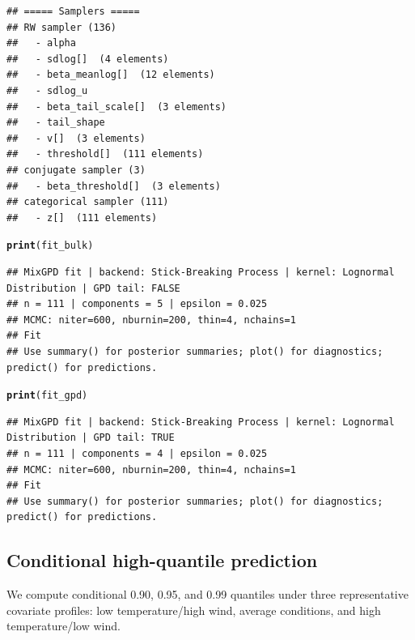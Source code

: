 \documentclass[article]{jss}\usepackage[]{graphicx}\usepackage[]{xcolor}
\makeatletter
\newcommand{\hldef}[1]{\textcolor[rgb]{0.345,0.345,0.345}{#1}}%
\newcommand{\hlkwd}[1]{\textcolor[rgb]{0.737,0.353,0.396}{\textbf{#1}}}%
\newenvironment{kframe}{%
 \def\at@end@of@kframe{}%
 \ifinner\ifhmode%
  \def\at@end@of@kframe{\end{minipage}}%
  \begin{minipage}{\columnwidth}%
 \fi\fi%
 \def\FrameCommand##1{\hskip\@totalleftmargin \hskip-\fboxsep
 \colorbox{shadecolor}{##1}\hskip-\fboxsep
     \hskip-\linewidth \hskip-\@totalleftmargin \hskip\columnwidth}%
 \MakeFramed {\advance\hsize-\width
   \@totalleftmargin\z@ \linewidth\hsize
   \@setminipage}}%
 {\par\unskip\endMakeFramed%
 \at@end@of@kframe}
\newenvironment{knitrout}{}{} %
\makeatother
\begin{document}
\begin{knitrout}
\begin{kframe}
\begin{verbatim}
## ===== Samplers =====
## RW sampler (136)
##   - alpha
##   - sdlog[]  (4 elements)
##   - beta_meanlog[]  (12 elements)
##   - sdlog_u
##   - beta_tail_scale[]  (3 elements)
##   - tail_shape
##   - v[]  (3 elements)
##   - threshold[]  (111 elements)
## conjugate sampler (3)
##   - beta_threshold[]  (3 elements)
## categorical sampler (111)
##   - z[]  (111 elements)
\end{verbatim}
\begin{alltt}
\hlkwd{print}\hldef{(fit_bulk)}
\end{alltt}
\begin{verbatim}
## MixGPD fit | backend: Stick-Breaking Process | kernel: Lognormal Distribution | GPD tail: FALSE
## n = 111 | components = 5 | epsilon = 0.025
## MCMC: niter=600, nburnin=200, thin=4, nchains=1 
## Fit
## Use summary() for posterior summaries; plot() for diagnostics; predict() for predictions.
\end{verbatim}
\begin{alltt}
\hlkwd{print}\hldef{(fit_gpd)}
\end{alltt}
\begin{verbatim}
## MixGPD fit | backend: Stick-Breaking Process | kernel: Lognormal Distribution | GPD tail: TRUE
## n = 111 | components = 4 | epsilon = 0.025
## MCMC: niter=600, nburnin=200, thin=4, nchains=1 
## Fit
## Use summary() for posterior summaries; plot() for diagnostics; predict() for predictions.
\end{verbatim}
\end{kframe}
\end{knitrout}

\subsection{Conditional high-quantile prediction}

We compute conditional 0.90, 0.95, and 0.99 quantiles under
three representative covariate profiles:
low temperature/high wind, average conditions, and high temperature/low wind.
\end{document}
